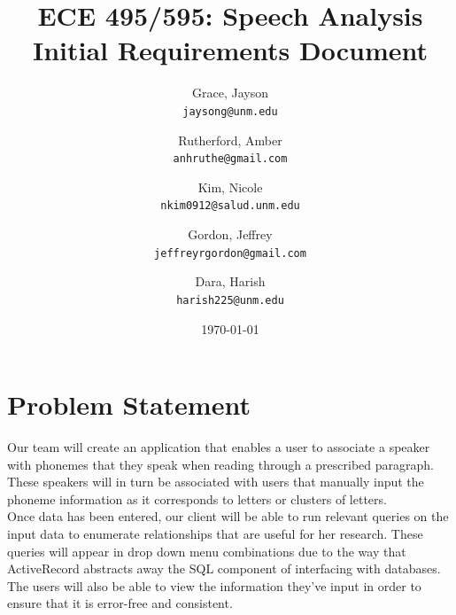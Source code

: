 \documentclass[12pt, a4paper, oneside]{article}
\begin{document}
\title{ECE 495/595: Speech Analysis Initial Requirements Document}
\author{
  Grace, Jayson \\
  \texttt{jaysong@unm.edu}
  \and
  Rutherford, Amber \\
  \texttt{anhruthe@gmail.com}  
  \and
  Kim, Nicole \\
  \texttt{nkim0912@salud.unm.edu}
  \and
  Gordon, Jeffrey \\
  \texttt{jeffreyrgordon@gmail.com}
  \and
  Dara, Harish \\
  \texttt{harish225@unm.edu} 
}
\date{\today}%
\maketitle

\pagebreak
{}

\section*{Problem Statement}
Our team will create an application that enables a user to associate a speaker with phonemes that they speak when reading through a prescribed paragraph. These speakers will in turn be associated with users that manually input the phoneme information as it corresponds to letters or clusters of letters. \\

Once data has been entered, our client will be able to run relevant queries on the input data to enumerate relationships that are useful for her research. These queries will appear in drop down menu combinations due to the way that ActiveRecord abstracts away the SQL component of interfacing with databases. The users will also be able to view the information they’ve input in order to ensure that it is error-free and consistent.
\end{document}
